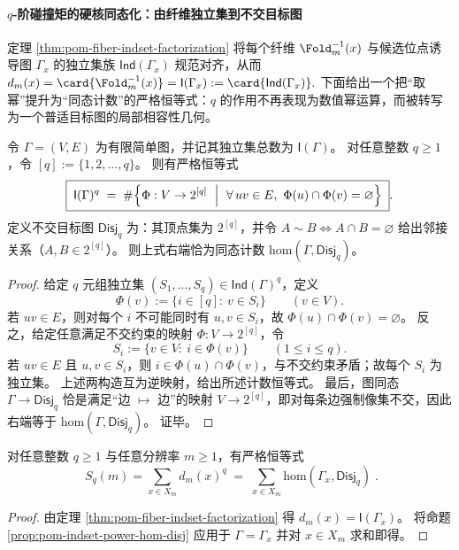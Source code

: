 
\paragraph{\texorpdfstring{$q$}{q}-阶碰撞矩的硬核同态化：由纤维独立集到不交目标图}
定理 \ref{thm:pom-fiber-indset-factorization} 将每个纤维 \(\Fold_m^{-1}(x)\) 与候选位点诱导图 \(\Gamma_x\) 的独立集族 \(\mathsf{Ind}(\Gamma_x)\) 规范对齐，从而
\(
d_m(x)=\card{\Fold_m^{-1}(x)}=\mathsf{I}(\Gamma_x)
:=\card{\mathsf{Ind}(\Gamma_x)}.
\)
下面给出一个把“取幂”提升为“同态计数”的严格恒等式：\(q\) 的作用不再表现为数值幂运算，而被转写为一个普适目标图的局部相容性几何。

\begin{proposition}[独立集幂与不交目标图同态计数的严格恒等式]\label{prop:pom-indset-power-hom-disj}
令 \(\Gamma=(V,E)\) 为有限简单图，并记其独立集总数为 \(\mathsf{I}(\Gamma)\)。
对任意整数 \(q\ge 1\)，令 \([q]:=\{1,2,\dots,q\}\)。
则有严格恒等式
\[
\boxed{\;
\mathsf{I}(\Gamma)^q
\;=\;
\#\Bigl\{\Phi:V\to 2^{[q]}\ \Bigm|\ \forall\,uv\in E,\ \Phi(u)\cap\Phi(v)=\varnothing\Bigr\}\; }.
\]
定义不交目标图 \(\mathsf{Disj}_q\) 为：其顶点集为 \(2^{[q]}\)，并令
\(
A\sim B \iff A\cap B=\varnothing
\)
给出邻接关系（\(A,B\in 2^{[q]}\)）。
则上式右端恰为同态计数 \(\mathrm{hom}(\Gamma,\mathsf{Disj}_q)\)。
\end{proposition}
\begin{proof}
给定 \(q\) 元组独立集 \((S_1,\dots,S_q)\in\mathsf{Ind}(\Gamma)^q\)，定义
\[
\Phi(v):=\{i\in[q]:\ v\in S_i\}\qquad(v\in V).
\]
若 \(uv\in E\)，则对每个 \(i\) 不可能同时有 \(u,v\in S_i\)，故 \(\Phi(u)\cap\Phi(v)=\varnothing\)。
反之，给定任意满足不交约束的映射 \(\Phi:V\to 2^{[q]}\)，令
\[
S_i:=\{v\in V:\ i\in\Phi(v)\}\qquad(1\le i\le q).
\]
若 \(uv\in E\) 且 \(u,v\in S_i\)，则 \(i\in\Phi(u)\cap\Phi(v)\)，与不交约束矛盾；故每个 \(S_i\) 为独立集。
上述两构造互为逆映射，给出所述计数恒等式。
最后，图同态 \(\Gamma\to\mathsf{Disj}_q\) 恰是满足“边 \(\mapsto\) 边”的映射 \(V\to 2^{[q]}\)，即对每条边强制像集不交，因此右端等于 \(\mathrm{hom}(\Gamma,\mathsf{Disj}_q)\)。
证毕。
\end{proof}

\begin{corollary}\label{cor:pom-collision-moment-hom-disj}
对任意整数 \(q\ge 1\) 与任意分辨率 \(m\ge 1\)，有严格恒等式
\[
\boxed{\;
S_q(m)=\sum_{x\in X_m} d_m(x)^q
\;=\;
\sum_{x\in X_m}\mathrm{hom}(\Gamma_x,\mathsf{Disj}_q)\; }.
\]
\end{corollary}
\begin{proof}
由定理 \ref{thm:pom-fiber-indset-factorization} 得 \(d_m(x)=\mathsf{I}(\Gamma_x)\)。
将命题 \ref{prop:pom-indset-power-hom-disj} 应用于 \(\Gamma=\Gamma_x\) 并对 \(x\in X_m\) 求和即得。
\end{proof}


